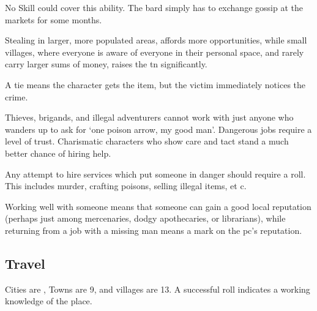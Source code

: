 \begin{multicols}{2}
No Skill could cover this ability.
The bard simply has to exchange gossip at the markets for some months.

Stealing in larger, more populated areas, affords more opportunities, while small \glspl{village}, where everyone is aware of everyone in their personal space, and rarely carry larger sums of money, raises the \gls{tn} significantly.


A tie means the character gets the item, but the victim immediately notices the crime.

\larcenyChart

Thieves, brigands, and illegal adventurers cannot work with just anyone who wanders up to ask for `one poison arrow, my good man'.
Dangerous jobs require a level of trust.
Charismatic characters who show care and tact stand a much better chance of hiring help.


Any attempt to hire services which put someone in danger should require a roll.
This includes murder, crafting poisons, selling illegal items, et c.

Working well with someone means that someone can gain a good local reputation (perhaps just among mercenaries, dodgy apothecaries, or librarians), while returning from a job with a missing man means a mark on the \gls{pc}'s reputation.

\subsection{Travel}

Cities are \tn[7], Towns are 9, and \glspl{village} are 13.
A successful roll indicates a working knowledge of the place.


\end{multicols}
